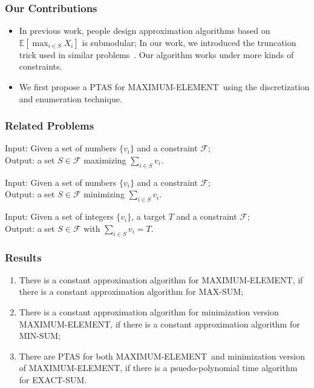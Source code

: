 \documentclass{beamer}
\newcommand{\calF}{{\mathcal F}}
\newcommand{\Exp}{{\mathbb{E}}}
\newcommand{\MM}{{\textsf{MAXIMUM-ELEMENT}}}
\newcommand{\MS}{{\textsf{MAX-SUM}}}
\newcommand{\ms}{{\textsf{MIN-SUM}}}
\newcommand{\ES}{{\textsf{EXACT-SUM}}}
\begin{document}
\begin{frame}
\frametitle{Our Contributions}
\begin{itemize}
    \item In previous work, people design approximation algorithms based on $\Exp[\max_{i\in S} X_i]$ is submodular; In our work, we introduced the truncation trick used in similar problems~\cite{kleinberg2000allocating,guha2009exceeding}. Our algorithm works under more kinds of constraints.
    \item We first propose a PTAS for \MM\ using the discretization and enumeration technique.
\end{itemize}
\end{frame}


\begin{frame}
    \frametitle{Related Problems}
    \begin{problem}
        Input: Given a set of numbers $\{v_i\}$ and a constraint $\calF$;\\
        Output: a set $S\in \calF$ maximizing $\sum_{i\in S} v_i$.
    \end{problem}
    \begin{problem}
        Input: Given a set of numbers $\{v_i\}$ and a constraint $\calF$;\\
        Output: a set $S\in\calF$ minimizing $\sum_{i\in S} v_i$.
    \end{problem}
    \begin{problem}
        Input: Given a set of integers $\{v_i\}$, a target $T$ and a constraint $\calF$;\\
        Output: a set $S\in \calF$ with $\sum_{i\in S} v_i = T$.
    \end{problem}
\end{frame}

\begin{frame}
\frametitle{Results}
\begin{theorem}
    \begin{enumerate}
        \item    There is a constant approximation algorithm for \MM, if there is a constant approximation algorithm for \MS;
        \item    There is a constant approximation algorithm for minimization version \MM, if there is a constant approximation algorithm for \ms;
        \item    There are PTAS for both \MM\ and minimization version of \MM, if there is a psuedo-polynomial time algorithm for \ES.
\end{enumerate}
\end{theorem}
\end{frame}
\end{document}
